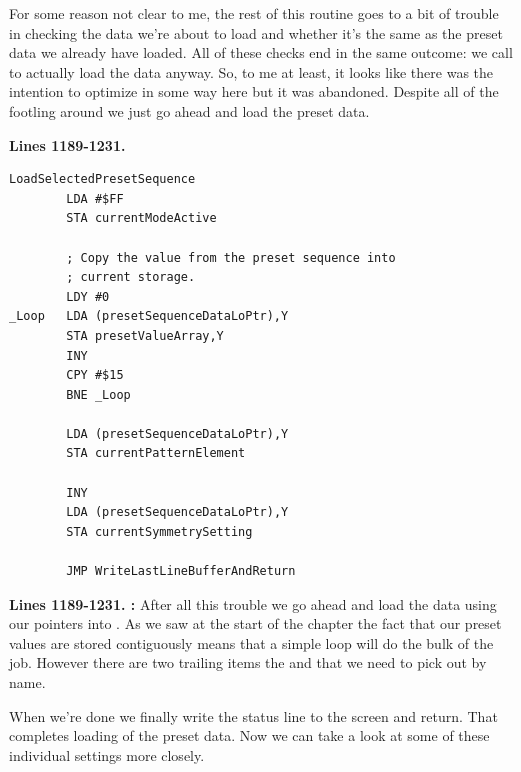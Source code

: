 For some reason not clear to me, the rest of this routine goes to a bit of trouble in checking the data we're about to load and whether it's the same
as the preset data we already have loaded. All of these checks end in the same outcome: we call  to actually load 
the data anyway. So, to me at least, it looks like there was the intention to optimize in some way here but it was abandoned. Despite all of the footling
around we just go ahead and load the preset data.

\clearpage

\textbf{Lines 1189-1231. } 
\begin{lstlisting}
LoadSelectedPresetSequence    
        LDA #$FF
        STA currentModeActive

        ; Copy the value from the preset sequence into 
        ; current storage.
        LDY #0
_Loop   LDA (presetSequenceDataLoPtr),Y
        STA presetValueArray,Y
        INY 
        CPY #$15
        BNE _Loop

        LDA (presetSequenceDataLoPtr),Y
        STA currentPatternElement

        INY 
        LDA (presetSequenceDataLoPtr),Y
        STA currentSymmetrySetting

        JMP WriteLastLineBufferAndReturn
\end{lstlisting}
\clearpage
\textbf{Lines 1189-1231. :} After all this trouble we go ahead and load the data using our pointers into 
. As we saw at the start of the chapter the fact that our preset values are stored contiguously means that a simple loop
will do the bulk of the job. However there are two trailing items the  and  that we need
to pick out by name. 

When we're done we finally write the status line to the screen and return. That completes loading of the preset data. Now we can take a look at some
of these individual settings more closely.

